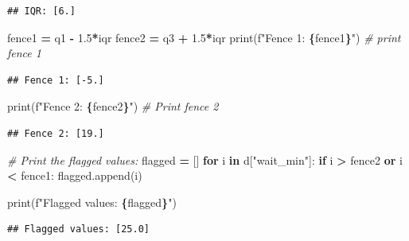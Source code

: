 \documentclass[
]{article}
\newenvironment{Shaded}{\begin{snugshade}}{\end{snugshade}}
\newcommand{\BuiltInTok}[1]{#1}
\newcommand{\CommentTok}[1]{\textcolor[rgb]{0.56,0.35,0.01}{\textit{#1}}}
\newcommand{\ControlFlowTok}[1]{\textcolor[rgb]{0.13,0.29,0.53}{\textbf{#1}}}
\newcommand{\FloatTok}[1]{\textcolor[rgb]{0.00,0.00,0.81}{#1}}
\newcommand{\KeywordTok}[1]{\textcolor[rgb]{0.13,0.29,0.53}{\textbf{#1}}}
\newcommand{\NormalTok}[1]{#1}
\newcommand{\OperatorTok}[1]{\textcolor[rgb]{0.81,0.36,0.00}{\textbf{#1}}}
\newcommand{\SpecialCharTok}[1]{\textcolor[rgb]{0.81,0.36,0.00}{\textbf{#1}}}
\newcommand{\SpecialStringTok}[1]{\textcolor[rgb]{0.31,0.60,0.02}{#1}}
\newcommand{\StringTok}[1]{\textcolor[rgb]{0.31,0.60,0.02}{#1}}
\begin{document}
\begin{verbatim}
## IQR: [6.]
\end{verbatim}

\begin{Shaded}
\begin{Highlighting}[]
\NormalTok{fence1 }\OperatorTok{=}\NormalTok{ q1 }\OperatorTok{{-}} \FloatTok{1.5}\OperatorTok{*}\NormalTok{iqr}
\NormalTok{fence2 }\OperatorTok{=}\NormalTok{ q3 }\OperatorTok{+} \FloatTok{1.5}\OperatorTok{*}\NormalTok{iqr}
\BuiltInTok{print}\NormalTok{(}\SpecialStringTok{f"Fence 1: }\SpecialCharTok{\{}\NormalTok{fence1}\SpecialCharTok{\}}\SpecialStringTok{"}\NormalTok{) }\CommentTok{\# print fence 1}
\end{Highlighting}
\end{Shaded}

\begin{verbatim}
## Fence 1: [-5.]
\end{verbatim}

\begin{Shaded}
\begin{Highlighting}[]
\BuiltInTok{print}\NormalTok{(}\SpecialStringTok{f"Fence 2: }\SpecialCharTok{\{}\NormalTok{fence2}\SpecialCharTok{\}}\SpecialStringTok{"}\NormalTok{) }\CommentTok{\# Print fence 2}
\end{Highlighting}
\end{Shaded}

\begin{verbatim}
## Fence 2: [19.]
\end{verbatim}

\begin{Shaded}
\begin{Highlighting}[]
\CommentTok{\# Print the flagged values:}
\NormalTok{flagged }\OperatorTok{=}\NormalTok{ []}
\ControlFlowTok{for}\NormalTok{ i }\KeywordTok{in}\NormalTok{ d[}\StringTok{"wait\_min"}\NormalTok{]:}
  \ControlFlowTok{if}\NormalTok{ i }\OperatorTok{\textgreater{}}\NormalTok{ fence2 }\KeywordTok{or}\NormalTok{ i }\OperatorTok{\textless{}}\NormalTok{ fence1:}
\NormalTok{    flagged.append(i)}

\BuiltInTok{print}\NormalTok{(}\SpecialStringTok{f"Flagged values: }\SpecialCharTok{\{}\NormalTok{flagged}\SpecialCharTok{\}}\SpecialStringTok{"}\NormalTok{)}
\end{Highlighting}
\end{Shaded}

\begin{verbatim}
## Flagged values: [25.0]
\end{verbatim}
\end{document}
